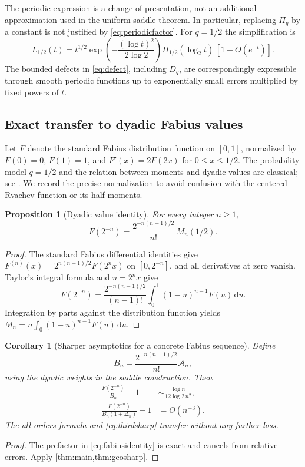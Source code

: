 \documentclass[11pt,a4paper]{article}
\numberwithin{equation}{section}
\newtheorem{proposition}[theorem]{Proposition}
\newtheorem{corollary}[theorem]{Corollary}
\theoremstyle{definition}\newtheorem{definition}[theorem]{Definition}
\theoremstyle{remark}\newtheorem{remark}[theorem]{Remark}
\newcommand{\dd}{\,\mathrm d}
\newcommand{\A}{\mathcal A}
\begin{document}
The periodic expression is a change of presentation, not an additional approximation used in the uniform saddle theorem. In particular, replacing $\Pi_q$ by a constant is not justified by \eqref{eq:periodicfactor}. For $q=1/2$ the simplification is
\begin{equation}\label{eq:dyadicproduct}
 L_{1/2}(t)=t^{1/2}\exp\!\left(-\frac{(\log t)^2}{2\log2}\right)
     \Pi_{1/2}(\log_2t)\,[1+O(e^{-t})].
\end{equation}
The bounded defects in \eqref{eq:defect}, including $D_q$, are correspondingly expressible through smooth periodic functions up to exponentially small errors multiplied by fixed powers of $t$.

\subsection{Exact transfer to dyadic Fabius values}
Let $F$ denote the standard Fabius distribution function on $[0,1]$, normalized by $F(0)=0$, $F(1)=1$, and $F'(x)=2F(2x)$ for $0\le x\le1/2$. The probability model $q=1/2$ and the relation between moments and dyadic values are classical; see \cite{arias1982,arias2017,have2017}. We record the precise normalization to avoid confusion with the centered Rvachev function or its half moments.

\begin{proposition}[Dyadic value identity]\label{prop:fabiusidentity}
For every integer $n\ge1$,
\begin{equation}\label{eq:fabiusidentity}
 F(2^{-n})=\frac{2^{-n(n-1)/2}}{n!}\,M_n(1/2).
\end{equation}
\end{proposition}
\begin{proof}
The standard Fabius differential identities give
$F^{(n)}(x)=2^{n(n+1)/2}F(2^nx)$ on $[0,2^{-n}]$, and all derivatives at zero vanish. Taylor's integral formula and $u=2^nx$ give
\[
 F(2^{-n})=
 \frac{2^{-n(n-1)/2}}{(n-1)!}\int_0^1(1-u)^{n-1}F(u)\dd u.
\]
Integration by parts against the distribution function yields
$M_n=n\int_0^1(1-u)^{n-1}F(u)\dd u$.
\end{proof}

\begin{corollary}[Sharper asymptotics for a concrete Fabius sequence]\label{cor:fabius}
Define
\[
 B_n=\frac{2^{-n(n-1)/2}}{n!}\A_n,
\]
using the dyadic weights in the saddle construction. Then
\begin{align}
 \frac{F(2^{-n})}{B_n}-1
       &\sim\frac{\log n}{12\log2\,n^2},\label{eq:fabiussharp}\\
 \frac{F(2^{-n})}{B_n(1+\Delta_n)}-1&=O(n^{-3}).\label{eq:fabiuscorrected}
\end{align}
The all-orders formula and \eqref{eq:thirdsharp} transfer without any further loss.
\end{corollary}
\begin{proof}
The prefactor in \eqref{eq:fabiusidentity} is exact and cancels from relative errors. Apply \cref{thm:main,thm:geosharp}.
\end{proof}
\end{document}
